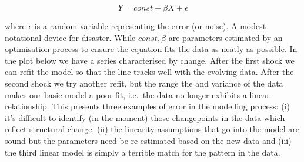 \documentclass[
]{book}
\theoremstyle{definition}
\theoremstyle{definition}
\theoremstyle{definition}
\theoremstyle{remark}
\begin{document}
\[ Y = const + \beta X + \epsilon  \]

where \(\epsilon\) is a random variable representing the error (or noise). A modest notational device for disaster. While \(const, \beta\) are parameters estimated by an optimisation process to ensure the equation fits the data as neatly as possible. In the plot below we have a series characterised by change. After the first shock we can refit the model so that the line tracks well with the evolving data. After the second shock we try another refit, but the range the and variance of the data makes our basic model a poor fit, i.e.~the data no longer exhibits a linear relationship. This presents three examples of error in the modelling process: (i) it's difficult to identify (in the moment) those changepoints in the data which reflect structural change, (ii) the linearity assumptions that go into the model are sound but the parameters need be re-estimated based on the new data and (iii) the third linear model is simply a terrible match for the pattern in the data.
\end{document}
